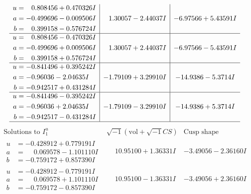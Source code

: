 \documentclass[1p]{elsarticle_modified}
\theoremstyle{definition}
\newcommand{\I}{\sqrt{-1}}
\begin{document}
$$\begin{array}{c|c|c}
\begin{aligned}
u &= \phantom{-}0.808456 + 0.470326 I \\
a &= -0.499696 - 0.009506 I \\
b &= \phantom{-}0.399158 - 0.576724 I\end{aligned}
 & \phantom{-}1.30057 - 2.44037 I & -6.97566 + 5.43591 I \\ \hline\begin{aligned}
u &= \phantom{-}0.808456 - 0.470326 I \\
a &= -0.499696 + 0.009506 I \\
b &= \phantom{-}0.399158 + 0.576724 I\end{aligned}
 & \phantom{-}1.30057 + 2.44037 I & -6.97566 - 5.43591 I \\ \hline\begin{aligned}
u &= -0.841496 + 0.395242 I \\
a &= -0.96036 - 2.04635 I \\
b &= -0.942517 + 0.431284 I\end{aligned}
 & -1.79109 + 3.29910 I & -14.9386 - 5.3714 I \\ \hline\begin{aligned}
u &= -0.841496 - 0.395242 I \\
a &= -0.96036 + 2.04635 I \\
b &= -0.942517 - 0.431284 I\end{aligned}
 & -1.79109 - 3.29910 I & -14.9386 + 5.3714 I\\
 \hline 
 \end{array}$$\newpage$$\begin{array}{c|c|c}  
\text{Solutions to }I^u_{1}& \I (\text{vol} + \sqrt{-1}CS) & \text{Cusp shape}\\
 \hline 
\begin{aligned}
u &= -0.428912 + 0.779191 I \\
a &= \phantom{-}0.069578 - 1.101110 I \\
b &= -0.759172 + 0.857390 I\end{aligned}
 & \phantom{-}10.95100 + 1.36331 I & -3.49056 - 2.36160 I \\ \hline\begin{aligned}
u &= -0.428912 - 0.779191 I \\
a &= \phantom{-}0.069578 + 1.101110 I \\
b &= -0.759172 - 0.857390 I\end{aligned}
 & \phantom{-}10.95100 - 1.36331 I & -3.49056 + 2.36160 I \\ \hline\begin{aligned}

\end{aligned}
\end{array}$$
\end{document}
